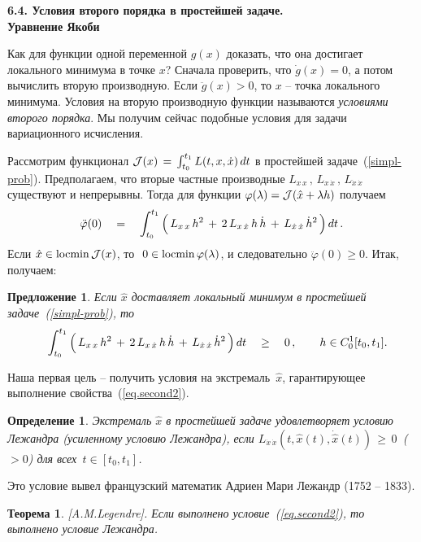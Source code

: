 \documentclass[12pt,a4paper]{article}
\newtheorem{theorem}{Теорема}
\newtheorem{prop}{Предложение}
\newtheorem{defi}{Определение}
\newcommand{\cJ}{{\cal{J}}}
\begin{document}
\begin{center}
\textbf{6.4. Условия второго порядка в простейшей задаче. \\ Уравнение Якоби}
\end{center}
\bigskip

Как для функции одной переменной $g(x)$ доказать, что она достигает локального минимума в точке  $x$?
Сначала проверить, что $\dot g(x) = 0$, а потом вычислить вторую производную.
Если $\ddot g (x) > 0$, то $x$ -- точка локального минимума. Условия на вторую производную функции 
называются {\em условиями второго порядка}. Мы получим сейчас подобные условия
 для задачи вариационного исчисления.

Рассмотрим функционал $\cJ(x)\,  = \, \int_{t_0}^{t_1}L(t, x, \dot x)\, d t$ в простейшей задаче~(\ref{simpl-prob}).
Предполагаем, что вторые частные производные $L_{x\, x}\, , \,
L_{x\, \dot x}\, , \,  L_{\dot x \, \dot x}$ существуют и
непрерывны. Тогда для функции $\varphi (\lambda) = \cJ(\hat x + \lambda h)$ получаем
\begin{equation}\label{eq.second1}
\ddot \varphi(0)\quad = \quad \int_{t_0}^{t_1}\, \Bigl( \, L_{x\,
x}\, { h}^2\, + \, 2\, L_{ x\, \dot x}\, h\, {\dot h}\, +\,
L_{\dot x\, \dot x}\, {\dot h}^2   \, \Bigr)\, d t\, .
\end{equation}
Если $\hat x \in {\rm locmin} \, \cJ (x)$, то $\ 0 \in {\rm locmin}\, \varphi(\lambda)$, и
следовательно  $\ddot \varphi(0) \ge 0$. Итак, получаем:
\begin{prop}\label{p.second2}
Если $\hat x$ доставляет локальный минимум в простейшей задаче~(\ref{simpl-prob}), то
\begin{equation}\label{eq.second2}
\quad \int_{t_0}^{t_1}\, \Bigl( \, L_{x\,
x}\, { h}^2\, + \, 2\, L_{ x\, \dot x}\, h\, {\dot h}\, +\,
L_{\dot x\, \dot x}\, {\dot h}^2   \, \Bigr)\, d t\quad \ge \quad 0\, , \qquad h \in C_0^1[t_0, t_1].
\end{equation}
\end{prop}
Наша первая цель -- получить условия на экстремаль~$\hat x$, гарантирующее выполнение
свойства~(\ref{eq.second2}).
\begin{defi}\label{d.Legandre}
Экстремаль $\hat x$ в простейшей задаче удовлетворяет условию
Лежандра (усиленному условию Лежандра), если $L_{\dot x \,
\dot x}(t, \hat x(t), \dot {\hat x}(t))\, \ge \, 0\, $ ($> 0$) для всех
$\, t \in [t_0, t_1]$.
\end{defi}
Это условие вывел французский математик  Адриен Мари Лежандр (1752 -- 1833).
\begin{theorem}\label{th.Legandre}[A.M.Legendre].
Если выполнено условие~(\ref{eq.second2}), то выполнено условие Лежандра.
\end{theorem}
\end{document}
